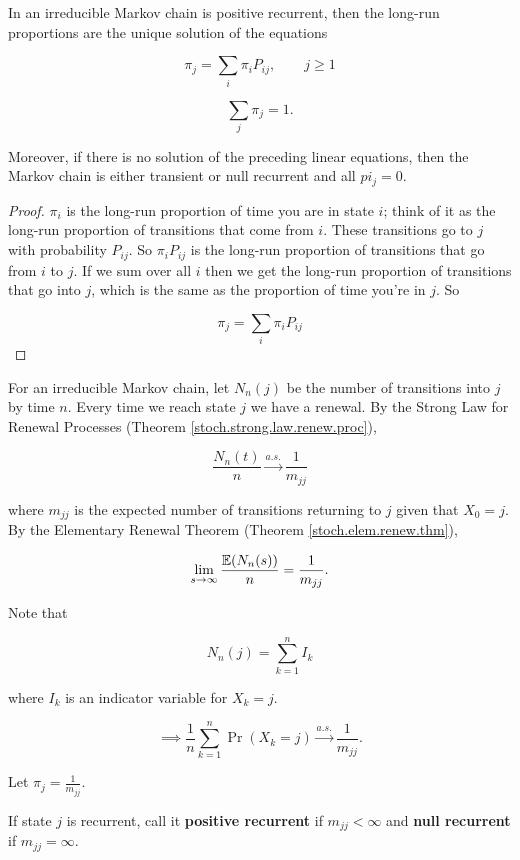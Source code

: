 \begin{theorem}In an irreducible Markov chain is positive recurrent, then the long-run proportions are the unique solution of the equations

\[
\pi_j = \sum_i \pi_i P_{ij}, \qquad j \geq 1
\]

\[
\sum_j \pi_j = 1.
\]

Moreover, if there is no solution of the preceding linear equations, then the Markov chain is either transient or null recurrent and all \(pi_j = 0\).

\end{theorem}

\begin{proof} \(\pi_i\) is the long-run proportion of time you are in state \(i\); think of it as the long-run proportion of transitions that come from \(i\). These transitions go to \(j\) with probability \(P_{ij}\). So \(\pi_i P_{ij} \) is the long-run proportion of transitions that go from \(i\) to \(j\). If we sum over all \(i\) then we get the long-run proportion of transitions that go into \(j\), which is the same as the proportion of time you're in \(j\). So

\[
\pi_j = \sum_i \pi_i P_{ij}
\]

\end{proof}

For an irreducible Markov chain, let \(N_n(j) \) be the number of transitions into \(j\) by time \(n\). Every time we reach state \(j\) we have a renewal. By the Strong Law for Renewal Processes (Theorem \ref{stoch.strong.law.renew.proc}), 

\[
\frac{N_n(t)}{n}  \xrightarrow{a.s.} \frac{1}{m_{jj}}
\]

where \(m_{jj}\) is the expected number of transitions returning to \(j\) given that \(X_0 = j\). By the Elementary Renewal Theorem (Theorem \ref{stoch.elem.renew.thm}),

\[
\lim_{s \to \infty} \frac{\E(N_n(s))}{n} = \frac{1}{m_{jj}} .
\]

Note that

\[
N_n(j) = \sum_{k=1}^n I_k
\]

where \(I_k\) is an indicator variable for \(X_k = j\).

\[
\implies  \frac{1}{n} \sum_{k=1}^n \Pr(X_k = j) \xrightarrow{a.s.} \frac{1}{m_{jj}}.
\]

Let \(\pi_j = \frac{1}{m_{jj}}\).

\begin{definition}If state \(j\) is recurrent, call it \textbf{positive recurrent} if \(m_{jj}<\infty\) and \textbf{null recurrent} if \(m_{jj}=\infty\).

\end{definition}

